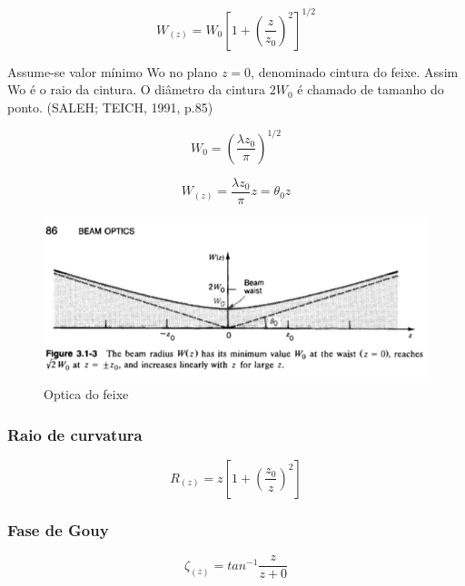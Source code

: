 \documentclass{fei}
\begin{document}
\begin{equation}
\label{eq:gaussiano_largura}
W_{(z)} = W_0 \left [ 1 + \left( \frac{z}{z_0} \right ) ^2 \right ] ^{1/2}
\end{equation}

Assume-se valor mínimo Wo no plano $z = 0$, denominado cintura do feixe. Assim Wo é o raio da cintura. O diâmetro da cintura $2W_0$ é chamado de tamanho do ponto. (SALEH; TEICH, 1991, p.85)

\begin{equation}
\label{eq:raio_cintura_1}
W_0 = \left( \frac{\lambda z_0}{\pi} \right)^{1/2}
\end{equation}

\begin{equation}
\label{eq:raio_cintura_2}
W_{(z)} = \frac{\lambda z_0}{\pi} z = \theta_0 z
\end{equation}

\begin{figure}
\centering
\label{beam_optics}
\caption{Optica do feixe}
\includegraphics{beam_optics}
\end{figure}

\subsubsection{Raio de curvatura}

\begin{equation}
\label{eq:raio_curvatura}
R_{(z)} = z \left [ 1 + \left( \frac{z_0}{z} \right ) ^2 \right ]
\end{equation}

\subsubsection{Fase de Gouy}

\begin{equation}
\label{eq:fase_gouy}
\zeta_{(z)} = tan^{-1} \frac{z}{z+0}
\end{equation}
\end{document}
